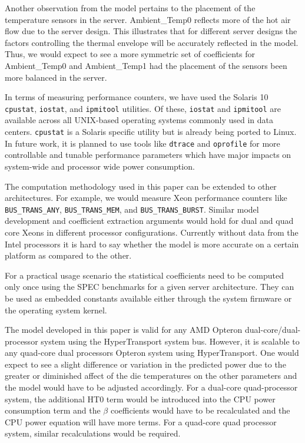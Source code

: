 \documentclass[times, 10pt, finalversion]{usetex-v1}
\begin{document}
Another observation from the model pertains to the placement of the
temperature sensors in the server.   Ambient\_Temp0 reflects more of the
hot air flow due to the server design.   This illustrates that for
different server designs the factors controlling the thermal envelope
will be accurately reflected in the model.   Thus, we would expect to
see a more symmetric set of coefficients for Ambient\_Temp0 and
Ambient\_Temp1 had the placement of the sensors been more balanced in
the server.

In terms of measuring performance counters, we have used the Solaris 10
\texttt{cpustat}, \texttt{iostat}, and \texttt{ipmitool} utilities. Of
these, \texttt{iostat} and \texttt{ipmitool} are available across all
UNIX-based operating systems commonly used in data
centers. \texttt{cpustat} is a Solaris specific utility but is already
being ported to Linux. In future work, it is planned to use tools like
\texttt{dtrace} and \texttt{oprofile} for more controllable and tunable
performance parameters which have major impacts on system-wide and
processor wide power consumption.

The computation methodology used in this paper can be extended to other
architectures.  For example, we would measure Xeon performance counters like
\texttt{BUS\_TRANS\_ANY}, \texttt{BUS\_TRANS\_MEM}, and
\texttt{BUS\_TRANS\_BURST}.  Similar model development and coefficient
extraction arguments would hold for dual and quad core Xeons in
different processor configurations. Currently without data from the
Intel processors it is hard to say whether the model is more accurate on
a certain platform as compared to the other.

For a practical usage scenario the statistical coefficients need to be
computed only once using the SPEC benchmarks for a given server
architecture. They can be used as embedded constants available either
through the system firmware or the operating system kernel.

The model developed in this paper is valid for any AMD Opteron
dual-core/dual-processor system using the HyperTransport system
bus. However, it is scalable to any quad-core dual processors Opteron
system using HyperTransport. One would expect to see a slight difference
or variation in the predicted power due to the greater or diminished
affect of the die temperatures on the other parameters and the model
would have to be adjusted accordingly. For a dual-core quad-processor
system, the additional HT0 term would be introduced into the CPU power
consumption term and the $\beta$ coefficients would have to be
recalculated and the CPU power equation will have more terms. For a
quad-core quad processor system, similar recalculations would be
required.
\end{document}
